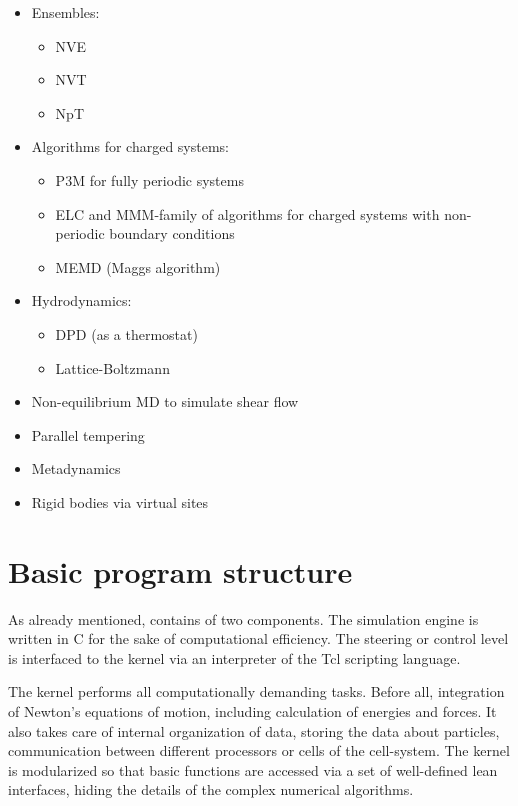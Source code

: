 \begin{itemize}
\item Ensembles: 
  \begin{itemize} 
  \item NVE
  \item NVT
  \item NpT
  \end{itemize}
\item Algorithms for charged systems:
  \begin{itemize}
  \item P3M for fully periodic systems
  \item ELC and MMM-family of algorithms for charged systems with
    non-periodic boundary conditions
  \item MEMD (Maggs algorithm)
  \end{itemize}
\item Hydrodynamics:
  \begin{itemize}
  \item DPD (as a thermostat)
  \item Lattice-Boltzmann
  \end{itemize}
\item Non-equilibrium MD to simulate shear flow
\item Parallel tempering
\item Metadynamics
\item Rigid bodies via virtual sites
\end{itemize}

\section{Basic program structure}
\label{sec:structure}

As already mentioned, \es contains of two components.
The simulation engine is written in C for the sake
of computational efficiency. The steering or control
level is interfaced to the kernel via an interpreter 
of the Tcl scripting language.

The kernel performs all computationally demanding tasks. Before all,
integration of Newton's equations of motion, including calculation of
energies and forces. It also takes care of internal organization of
data, storing the data about particles, communication between
different processors or cells of the cell-system. The kernel is
modularized so that basic functions are accessed via a set of
well-defined lean interfaces, hiding the details of the complex
numerical algorithms.

